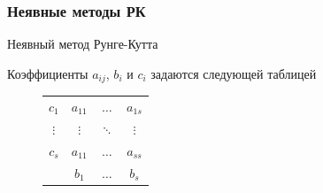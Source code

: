 \documentclass[t]{beamer}
\begin{document}
\begin{frame}
    \frametitle{Неявные методы РК}
    \begin{block}{Неявный метод Рунге-Кутта}
    \end{block}

    Коэффициенты $a_{ij}$, $b_i$ и $c_i$ задаются следующей таблицей

    \begin{block}{}
        \begin{figure}[h]
            \renewcommand{\arraystretch}{1.2}
            \centering
            \begin{tabular}{c|ccc}
                $c_1$    & $a_{11}$ & $\ldots$ & $a_{1s}$ \\
                $\vdots$ & $\vdots$ & $\ddots$ & $\vdots$ \\
                $c_s$    & $a_{11}$ & $\ldots$ & $a_{ss}$ \\ \hline
                         & $b_{1}$  & $\ldots$ & $b_{s}$ \\
            \end{tabular}
        \end{figure}
    \end{block}
\end{frame}
\end{document}
